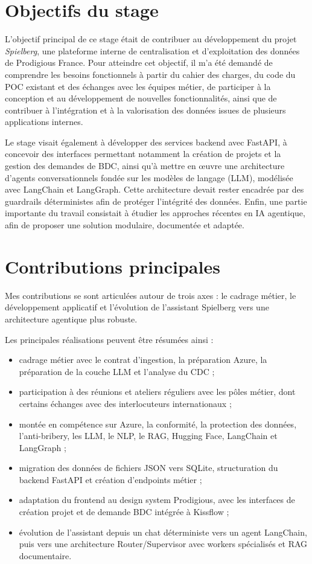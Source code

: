 \documentclass[a4paper,11pt,english,openany]{book}
\begin{document}
\section{Objectifs du stage}

L'objectif principal de ce stage était de contribuer au développement du projet \textit{Spielberg}, une plateforme interne de centralisation et d'exploitation des données de Prodigious France. Pour atteindre cet objectif, il m'a été demandé de comprendre les besoins fonctionnels à partir du cahier des charges, du code du POC existant et des échanges avec les équipes métier, de participer à la conception et au développement de nouvelles fonctionnalités, ainsi que de contribuer à l'intégration et à la valorisation des données issues de plusieurs applications internes.

Le stage visait également à développer des services backend avec FastAPI, à concevoir des interfaces permettant notamment la création de projets et la gestion des demandes de BDC, ainsi qu'à mettre en œuvre une architecture d'agents conversationnels fondée sur les modèles de langage (LLM), modélisée avec LangChain et LangGraph. Cette architecture devait rester encadrée par des guardrails déterministes afin de protéger l'intégrité des données. Enfin, une partie importante du travail consistait à étudier les approches récentes en IA agentique, afin de proposer une solution modulaire, documentée et adaptée.


\section{Contributions principales}

Mes contributions se sont articulées autour de trois axes : le cadrage métier, le développement applicatif et l'évolution de l'assistant Spielberg vers une architecture agentique plus robuste.

Les principales réalisations peuvent être résumées ainsi :
\begin{itemize}
    \item cadrage métier avec le contrat d'ingestion, la préparation Azure, la préparation de la couche LLM et l'analyse du CDC ;
    \item participation à des réunions et ateliers réguliers avec les pôles métier, dont certains échanges avec des interlocuteurs internationaux ;
    \item montée en compétence sur Azure, la conformité, la protection des données, l'anti-bribery, les LLM, le NLP, le RAG, Hugging Face, LangChain et LangGraph ;
    \item migration des données de fichiers JSON vers SQLite, structuration du backend FastAPI et création d'endpoints métier ;
    \item adaptation du frontend au design system Prodigious, avec les interfaces de création projet et de demande BDC intégrée à Kissflow ;
    \item évolution de l'assistant depuis un chat déterministe vers un agent LangChain, puis vers une architecture Router/Supervisor avec workers spécialisés et RAG documentaire.
\end{itemize}
\end{document}
